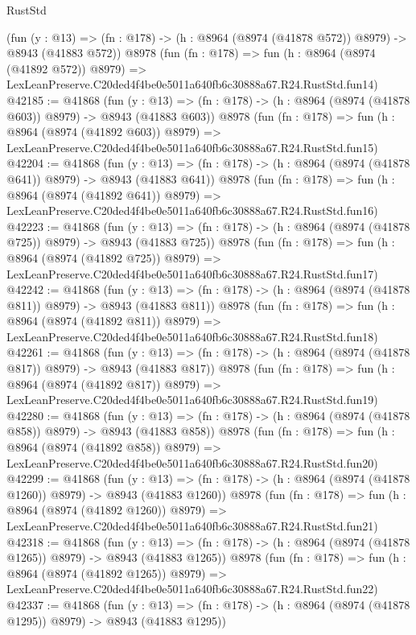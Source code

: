 \begin{lexlean}{RustStd}
\begin{coremodule}
    (fun (y : @13) => (fn : @178) -> (h : @8964 (@8974 (@41878 @572)) @8979) -> @8943 (@41883 @572))
    @8978
    (fun (fn : @178) =>
    fun (h : @8964 (@8974 (@41892 @572)) @8979) =>
    LexLeanPreserve.C20ded4f4be0e5011a640fb6c30888a67.R24.RustStd.fun14)
@42185 := @41868
    (fun (y : @13) => (fn : @178) -> (h : @8964 (@8974 (@41878 @603)) @8979) -> @8943 (@41883 @603))
    @8978
    (fun (fn : @178) =>
    fun (h : @8964 (@8974 (@41892 @603)) @8979) =>
    LexLeanPreserve.C20ded4f4be0e5011a640fb6c30888a67.R24.RustStd.fun15)
@42204 := @41868
    (fun (y : @13) => (fn : @178) -> (h : @8964 (@8974 (@41878 @641)) @8979) -> @8943 (@41883 @641))
    @8978
    (fun (fn : @178) =>
    fun (h : @8964 (@8974 (@41892 @641)) @8979) =>
    LexLeanPreserve.C20ded4f4be0e5011a640fb6c30888a67.R24.RustStd.fun16)
@42223 := @41868
    (fun (y : @13) => (fn : @178) -> (h : @8964 (@8974 (@41878 @725)) @8979) -> @8943 (@41883 @725))
    @8978
    (fun (fn : @178) =>
    fun (h : @8964 (@8974 (@41892 @725)) @8979) =>
    LexLeanPreserve.C20ded4f4be0e5011a640fb6c30888a67.R24.RustStd.fun17)
@42242 := @41868
    (fun (y : @13) => (fn : @178) -> (h : @8964 (@8974 (@41878 @811)) @8979) -> @8943 (@41883 @811))
    @8978
    (fun (fn : @178) =>
    fun (h : @8964 (@8974 (@41892 @811)) @8979) =>
    LexLeanPreserve.C20ded4f4be0e5011a640fb6c30888a67.R24.RustStd.fun18)
@42261 := @41868
    (fun (y : @13) => (fn : @178) -> (h : @8964 (@8974 (@41878 @817)) @8979) -> @8943 (@41883 @817))
    @8978
    (fun (fn : @178) =>
    fun (h : @8964 (@8974 (@41892 @817)) @8979) =>
    LexLeanPreserve.C20ded4f4be0e5011a640fb6c30888a67.R24.RustStd.fun19)
@42280 := @41868
    (fun (y : @13) => (fn : @178) -> (h : @8964 (@8974 (@41878 @858)) @8979) -> @8943 (@41883 @858))
    @8978
    (fun (fn : @178) =>
    fun (h : @8964 (@8974 (@41892 @858)) @8979) =>
    LexLeanPreserve.C20ded4f4be0e5011a640fb6c30888a67.R24.RustStd.fun20)
@42299 := @41868
    (fun (y : @13) =>
    (fn : @178) -> (h : @8964 (@8974 (@41878 @1260)) @8979) -> @8943 (@41883 @1260))
    @8978
    (fun (fn : @178) =>
    fun (h : @8964 (@8974 (@41892 @1260)) @8979) =>
    LexLeanPreserve.C20ded4f4be0e5011a640fb6c30888a67.R24.RustStd.fun21)
@42318 := @41868
    (fun (y : @13) =>
    (fn : @178) -> (h : @8964 (@8974 (@41878 @1265)) @8979) -> @8943 (@41883 @1265))
    @8978
    (fun (fn : @178) =>
    fun (h : @8964 (@8974 (@41892 @1265)) @8979) =>
    LexLeanPreserve.C20ded4f4be0e5011a640fb6c30888a67.R24.RustStd.fun22)
@42337 := @41868
    (fun (y : @13) =>
    (fn : @178) -> (h : @8964 (@8974 (@41878 @1295)) @8979) -> @8943 (@41883 @1295))

\end{coremodule}
\end{lexlean}
